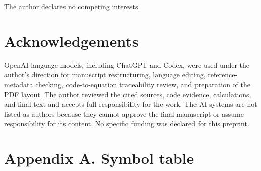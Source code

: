 \documentclass[
  10pt,
  a4paper,
  DIV=11,
  numbers=noendperiod]{scrartcl}
\begin{document}
The author declares no competing interests.

\section{Acknowledgements}\label{acknowledgements}

OpenAI language models, including ChatGPT and Codex, were used under the
author's direction for manuscript restructuring, language editing,
reference-metadata checking, code-to-equation traceability review, and
preparation of the PDF layout. The author reviewed the cited sources,
code evidence, calculations, and final text and accepts full
responsibility for the work. The AI systems are not listed as authors
because they cannot approve the final manuscript or assume
responsibility for its content. No specific funding was declared for
this preprint.

\section{Appendix A. Symbol table}\label{appendix-a.-symbol-table}
\end{document}
